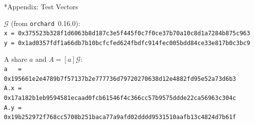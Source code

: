 \documentclass[10pt,letterpaper]{article}
\makeatletter
\renewcommand\section{\@startsection{section}{1}{\z@}{-1.3em}{0.45em}{\normalfont\large\bfseries}}
\theoremstyle{plain}
\theoremstyle{definition}
\newcommand{\Gor}{\mathcal{G}}
\newcommand{\fn}[1]{\texttt{#1}}
\makeatother
\begin{document}
\appendix
\section*{Appendix: Test Vectors}
{\small
$\Gor$ (from \fn{orchard}~0.16.0):\\
\texttt{x = 0x375523b328f1d6063b8d187c3e5f445f0c7f0ce37b70a10c8d1a7284b875c963}\\
\texttt{y = 0x1ad0357fdf1a66db7b10bcfcfed624fbdfc914fec005bdd84ce33e817b0c3bc9}

A share $a$ and $A = [a]\Gor$:\\
\texttt{a\ \ \ = 0x195661e2e4789b7f57137b2e777736d79720270638d12e4882fd95e52a73d6b3}\\
\texttt{A.x = 0x17a182b1eb9594581ecaad0fcb61546f4c366cc57b9575ddde22ca56963c304c}\\
\texttt{A.y = 0x19b252972f768cc5708b251baca77a9afd02dddd9531510aafb13c4824d7b61f}
}
\end{document}

